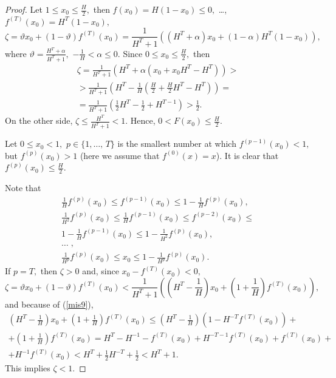 \documentclass[12pt,a4paper]{amsart}
\begin{document}
\begin{proof}
Let $1\leq x_0 \leq \frac{H}{2},$ then $f(x_0)=H(1-x_0)\leq 0,$ \ldots, $f^{(T)}(x_0)=H^T (1-x_0),$
$$
\zeta=\vartheta x_0 + (1-\vartheta)f^{(T)}(x_0)=\frac{1}{H^T + 1} \left ( (H^T+\alpha)x_0 + (1-\alpha)H^T(1-x_0)\right),
$$
where $\vartheta=\frac{H^T+\alpha}{H^T+1},$ $-\frac{1}{H} < \alpha \leq 0.$ Since $0\leq x_0 \leq \frac{H}{2},$ then 
\begin{gather*}
\zeta = \frac{1}{H^T+1} \left( H^T + \alpha(x_0 + x_0 H^T - H^T)\right) > \\
> \frac{1}{H^T+1} \left( H^T - \frac{1}{H} \left(\frac{H}{2} + \frac{H}{2} H^T - H^T\right)\right) = \\
= \frac{1}{H^T+1} \left( \frac12 H^T - \frac12 + H^{T-1} \right) > \frac12.
\end{gather*}
On the other side, $\zeta \leq \frac{H^T}{H^T+1} < 1.$ Hence, $0 < F(x_0)\leq \frac{H}{2}.$

Let $0 \leq x_0 < 1,$ $p\in \{1,\ldots,\,T\}$ is the smallest number at which $f^{(p-1)}(x_0) < 1,$ but $f^{(p)}(x_0)>1$
(here we assume that $f^{(0)}(x)=x$). It is clear that $f^{(p)}(x_0) \leq \frac{H}{2}.$

Note that
\begin{equation}\label{mis9}
\begin{split}
\frac{1}{H} f^{(p)}(x_0) \leq f^{(p-1)}(x_0) \leq 1 - \frac{1}{H} f^{(p)}(x_0), \\
\frac{1}{H^2} f^{(p)}(x_0) \leq \frac{1}{H} f^{(p-1)}(x_0) \leq f^{(p-2)}(x_0) \leq \\ 1-\frac{1}{H} f^{(p-1)}(x_0) \leq 
1 - \frac{1}{H^2} f^{(p)}(x_0), \\
\ldots\;, \\
\frac{1}{H^p} f^{(p)}(x_0) \leq x_0 \leq 1 - \frac{1}{H^p} f^{(p)}(x_0).
\end{split}
\end{equation}
If $p=T,$ then $\zeta  > 0$ and, since $x_0 - f^{(T)}(x_0) < 0,$ 
$$
\zeta=\vartheta x_0 + (1-\vartheta)f^{(T)}(x_0) < 
\frac{1}{H^T + 1} \left ( \left(H^T - \frac{1}{H}\right)x_0 + \left(1 + \frac{1}{H}\right) f^{(T)}(x_0) \right),
$$
and because of (\ref{mis9}), 
\begin{gather*}
\left(H^T - \frac{1}{H}\right)x_0 + \left(1 + \frac{1}{H}\right) f^{(T)}(x_0) \leq \left(H^T - \frac{1}{H}\right)
\left(1 - H^{-T} f^{(T)}(x_0)\right) + \\
+ \left(1 + \frac{1}{H}\right) f^{(T)}(x_0) = H^T - H^{-1} -f^{(T)}(x_0) + H^{-T-1}f^{(T)}(x_0) + f^{(T)}(x_0) +\\
+ H^{-1}f^{(T)}(x_0) < H^T + \frac12 H^{-T} +\frac12 < H^T +1.
\end{gather*}
This implies $\zeta < 1.$


\end{proof}
\end{document}
